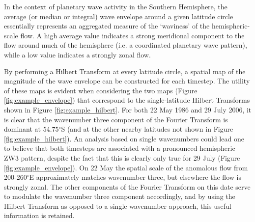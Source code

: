 In the context of planetary wave activity in the Southern Hemisphere, the average (or median or integral) wave envelope around a given latitude circle essentially represents an aggregated measure of the `waviness' of the hemispheric-scale flow. A high average value indicates a strong meridional component to the flow around much of the hemisphere (i.e. a coordinated planetary wave pattern), while a low value indicates a strongly zonal flow. 

By performing a Hilbert Transform at every latitude circle, a spatial map of the magnitude of the wave envelope can be constructed for each timestep. The utility of these maps is evident when considering the two maps (Figure \ref{fig:example_envelope}) that correspond to the single-latitude Hilbert Transforms shown in Figure \ref{fig:example_hilbert}. For both 22 May 1986 and 29 July 2006, it is clear that the wavenumber three component of the Fourier Transform is dominant at 54.75$^{\circ}$S (and at the other nearby latitudes not shown in Figure \ref{fig:example_hilbert}). An analysis based on single wavenumbers could lead one to believe that both timesteps are associated with a pronounced hemispheric ZW3 pattern, despite the fact that this is clearly only true for 29 July (Figure \ref{fig:example_envelope}). On 22 May the spatial scale of the anomalous flow from 200-260$^{\circ}$E approximately matches wavenumber three, but elsewhere the flow is strongly zonal. The other components of the Fourier Transform on this date serve to modulate the wavenumber three component accordingly, and by using the Hilbert Transform as opposed to a single wavenumber approach, this useful information is retained.
